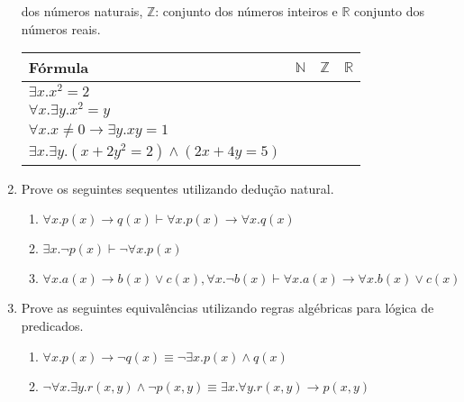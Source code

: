 \documentclass[11pt,a4paper]{report}
\begin{document}
\begin{enumerate}
         dos n\'umeros naturais, $\mathbb{Z}$: conjunto dos n\'umeros inteiros e $\mathbb{R}$ conjunto
         dos n\'umeros reais.
         \begin{center}
         \begin{tabular}{|l|c|c|c|}
             \hline
             F\'ormula & $\mathbb{N}$ & $\mathbb{Z}$ & $\mathbb{R}$ \\ \hline
             $\exists x. x^2 = 2$ & & &\\ \hline
             $\forall x. \exists y. x^2 = y$ & & & \\ \hline
             $\forall x. x\neq 0 \rightarrow \exists y. xy = 1$ & & & \\ \hline
             $\exists x. \exists y. (x + 2y^2 = 2) \land (2x + 4y = 5)$ & & & \\
             \hline
         \end{tabular}
         \end{center}
         \item Prove os seguintes sequentes utilizando dedu\c{c}\~ao natural.
         \begin{enumerate}
           \item $\forall x. p(x) \rightarrow q(x) \vdash \forall x. p(x) \rightarrow \forall x. q(x)$
           \item $\exists x. \neg p(x) \vdash \neg \forall x. p(x)$
           \item $\forall x. a(x)\rightarrow b(x) \lor c(x), \forall x. \neg b(x)\vdash \forall x. a(x)\rightarrow\forall x.b(x)\lor c(x)$
         \end{enumerate}
         \item Prove as seguintes equival\^encias utilizando regras alg\'ebricas para l\'ogica de predicados.
         \begin{enumerate}
            \item $\forall x. p(x) \rightarrow \neg q(x) \equiv \neg \exists x. p(x) \land q(x)$
            \item $\neg \forall x.\exists y. r(x,y)\land \neg p(x,y)\equiv\exists x.\forall y.r(x,y)\rightarrow p(x,y)$
         \end{enumerate}
   \end{enumerate}
\end{document}
